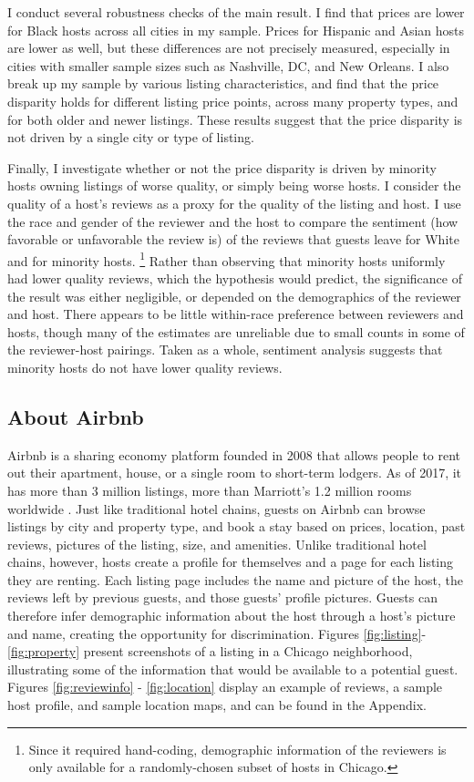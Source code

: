 I conduct several robustness checks of the main result. I find that prices are lower for Black hosts across all cities in my sample. Prices for Hispanic and Asian hosts are lower as well, but these differences are not precisely measured, especially in cities with smaller sample sizes such as Nashville, DC, and New Orleans. I also break up my sample by various listing characteristics, and find that the price disparity holds for different listing price points, across many property types, and for both older and newer listings. These results suggest that the price disparity is not driven by a single city or type of listing. 

Finally, I investigate whether or not the price disparity is driven by minority hosts owning listings of worse quality, or simply being worse hosts. I consider the quality of a host's reviews as a proxy for the quality of the listing and host. I use the race and gender of the reviewer and the host to compare the sentiment (how favorable or unfavorable the review is) of the reviews that guests leave for White and for minority hosts.%
	\footnote{Since it required hand-coding, demographic information of the reviewers is only available for a randomly-chosen subset of hosts in Chicago.} 
Rather than observing that minority hosts uniformly had lower quality reviews, which the hypothesis would predict, the significance of the result was either negligible, or depended on the demographics of the reviewer and host. There appears to be little within-race preference between reviewers and hosts, though many of the estimates are unreliable due to small counts in some of the reviewer-host pairings. Taken as a whole, sentiment analysis suggests that minority hosts do not have lower quality reviews. 


\subsection{About Airbnb} 
\label{about}

Airbnb is a sharing economy platform founded in 2008 that allows people to rent out their apartment, house, or a single room to short-term lodgers. As of 2017, it has more than 3 million listings, more than Marriott's 1.2 million rooms worldwide \citep{aboutus}. Just like traditional hotel chains, guests on Airbnb can browse listings by city and property type, and book a stay based on prices, location, past reviews, pictures of the listing, size, and amenities. Unlike traditional hotel chains, however, hosts create a profile for themselves and a page for each listing they are renting. Each listing page includes the name and picture of the host, the reviews left by previous guests, and those guests' profile pictures. Guests can therefore infer demographic information about the host through a host's picture and name, creating the opportunity for discrimination. Figures \ref{fig:listing}-\ref{fig:property} present screenshots of a listing in a Chicago neighborhood, illustrating some of the information that would be available to a potential guest. Figures \ref{fig:reviewinfo} - \ref{fig:location} display an example of reviews, a sample host profile, and sample location maps, and can be found in the Appendix.




